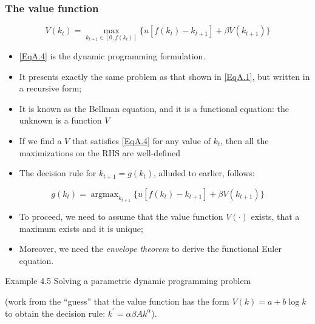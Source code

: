 \documentclass[10pt, handout]{beamer}
\DeclareMathOperator*{\argmax}{argmax} %
\begin{document}
\begin{frame}

\frametitle{The value function} \vskip 0.1in


\begin{equation}\label{EqA.4}
V(k_{t}) = \max_{k_{t+1} \in [0,f(k_t)] } \{ u [f(k_{t})-k_{t+1}] +
\beta V(k_{t+1}) \}
\end{equation}

\begin{itemize}
\item \eqref{EqA.4} is the dynamic programming formulation.
\item It presents exactly the same problem as that shown in \eqref{EqA.1}, but written in a recursive form;
\item It is known as the Bellman equation, and it is a functional equation: the unknown is a function $V$
\item If we find a $V$ that satisfies \eqref{EqA.4} for any value of $k_t$, then all the maximizations on the RHS are well-defined
\item The decision rule for $k_{t+1} = g(k_t)$, alluded to earlier, follows:
\end{itemize}
\begin{equation}
g(k_t) = \argmax_{k_{t+1}} \{ u [f(k_{t})-k_{t+1}] +
\beta V(k_{t+1}) \}
\end{equation}
\begin{itemize}
\item To proceed, we need to assume that the value function
$V(\cdot)$ exists, that a maximum exists and it is unique;
\item Moreover, we need the \emph{envelope theorem} to derive the functional Euler equation.
\end{itemize}
\end{frame}


\begin{frame}
Example 4.5 Solving a parametric dynamic programming problem

(work from the ``guess'' that the value function has the form $V(k) = a + b\log{k}$ to obtain the decision rule: $k^{\prime} = \alpha \beta A k^{\alpha}$). 
\end{frame}
\end{document}

